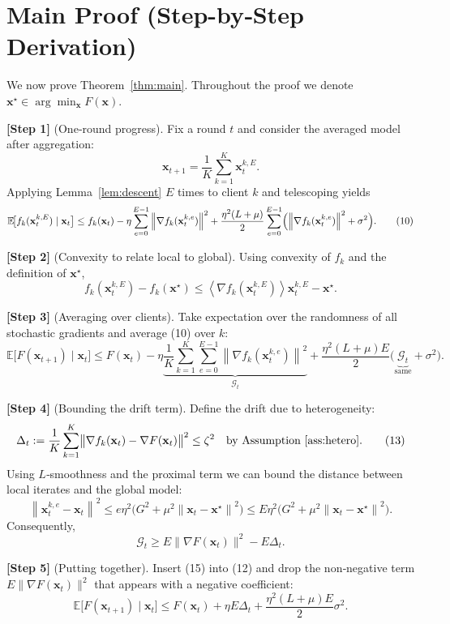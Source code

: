 \documentclass{article}
\newcommand{\E}{\mathbb{E}}
\newcommand{\norm}[1]{\left\|#1\right\|}
\newcommand{\inner}[1]{\left\langle#1\right\rangle}
\begin{document}
\section*{Main Proof (Step-by‑Step Derivation)}
We now prove Theorem~\ref{thm:main}.  
Throughout the proof we denote $\mathbf{x}^\star\in\arg\min_{\mathbf{x}}F(\mathbf{x})$.

\noindent\textbf{[Step 1]} (One‑round progress).  
Fix a round $t$ and consider the averaged model after aggregation:
\[
\mathbf{x}_{t+1}= \frac1K\sum_{k=1}^K\mathbf{x}_{t}^{k,E}.
\]
Applying Lemma~\ref{lem:descent} $E$ times to client $k$ and telescoping yields
\[
\E\!\bigl[f_k(\mathbf{x}_{t}^{k,E})\mid\mathbf{x}_t\bigr]\le
f_k(\mathbf{x}_t)-\eta\sum_{e=0}^{E-1}\norm{\nabla f_k(\mathbf{x}_{t}^{k,e})}^2
   +\frac{\eta^2(L+\mu)}{2}\sum_{e=0}^{E-1}\Bigl(\norm{\nabla f_k(\mathbf{x}_{t}^{k,e})}^2+\sigma^2\Bigr).
\tag{10}
\]

\noindent\textbf{[Step 2]} (Convexity to relate local to global).  
Using convexity of $f_k$ and the definition of $\mathbf{x}^\star$,
\[
f_k(\mathbf{x}_{t}^{k,E})-f_k(\mathbf{x}^\star)
   \le\inner{\nabla f_k(\mathbf{x}_{t}^{k,E})}{\mathbf{x}_{t}^{k,E}-\mathbf{x}^\star}.
\tag{11}
\]

\noindent\textbf{[Step 3]} (Averaging over clients).  
Take expectation over the randomness of all stochastic gradients and average (10) over $k$:
\[
\E\!\bigl[F(\mathbf{x}_{t+1})\mid\mathbf{x}_t\bigr]\le
F(\mathbf{x}_t)
   -\eta\underbrace{\frac1K\sum_{k=1}^K\sum_{e=0}^{E-1}\norm{\nabla f_k(\mathbf{x}_{t}^{k,e})}^2}_{\displaystyle \mathcal{G}_t}
   +\frac{\eta^2(L+\mu)E}{2}\bigl(\underbrace{\mathcal{G}_t}_{\text{same}}+ \sigma^2\bigr).
\tag{12}
\]

\noindent\textbf{[Step 4]} (Bounding the drift term).  
Define the drift due to heterogeneity:
\[
\Delta_t:=\frac1K\sum_{k=1}^K\bigl\|\nabla f_k(\mathbf{x}_t)-\nabla F(\mathbf{x}_t)\bigr\|^2\le\zeta^2
\quad\text{by Assumption~\ref{ass:hetero}}.
\tag{13}
\]
Using $L$‑smoothness and the proximal term we can bound the distance between local iterates and the global model:
\[
\norm{\mathbf{x}_{t}^{k,e}-\mathbf{x}_t}^2\le e\eta^2\bigl(G^2+\mu^2\norm{\mathbf{x}_t-\mathbf{x}^\star}^2\bigr)
\le E\eta^2\bigl(G^2+\mu^2\norm{\mathbf{x}_t-\mathbf{x}^\star}^2\bigr).
\tag{14}
\]
Consequently,
\[
\mathcal{G}_t\ge E\bigl\|\nabla F(\mathbf{x}_t)\bigr\|^2 -E\Delta_t.
\tag{15}
\]

\noindent\textbf{[Step 5]} (Putting together).  
Insert (15) into (12) and drop the non‑negative term $E\|\nabla F(\mathbf{x}_t)\|^2$ that appears with a negative coefficient:
\[
\E\!\bigl[F(\mathbf{x}_{t+1})\mid\mathbf{x}_t\bigr]
\le F(\mathbf{x}_t)
   +\eta E\Delta_t
   +\frac{\eta^2(L+\mu)E}{2}\sigma^2 .
\tag{16}
\]
\end{document}
